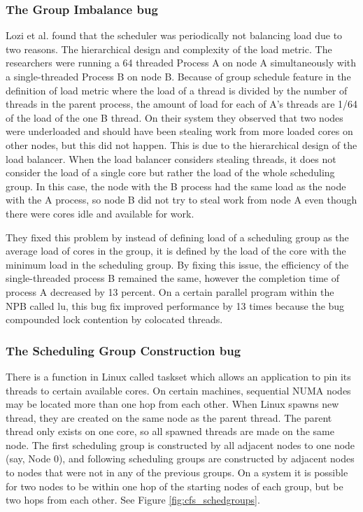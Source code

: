 \documentclass{sig-alternate}
\begin{document}
\subsubsection{The Group Imbalance bug}
\label{sec:cfsfault_grpimbalance}

Lozi et al. found that the scheduler was periodically not balancing load due to two reasons. The hierarchical design and complexity of the load metric. The researchers were running a 64 threaded  Process A on node A simultaneously with a single-threaded Process B on node B. Because of group schedule feature in the definition of load metric where the load of a thread is divided by the number of threads in the parent process, the amount of load for each of A's threads are 1/64 of the load of the one B thread. On their system they observed that two nodes were underloaded and should have been stealing work from more loaded cores on other nodes, but this did not happen. This is due to the hierarchical design of the load balancer. When the load balancer considers stealing threads, it does not consider the load of a single core but rather the load of the whole scheduling group. In this case, the node with the B process had the same load as the node with the A process, so node B did not try to steal work from node A even though there were cores idle and available for work.~\cite{Lozi:2016}

They fixed this problem by instead of defining load of a scheduling group as the average load of cores in the group, it is defined by the load of the core with the minimum load in the scheduling group. By fixing this issue, the efficiency of the single-threaded process B remained the same, however the completion time of process A decreased by 13 percent. On a certain parallel program within the NPB called lu, this bug fix improved performance by 13 times because the bug compounded lock contention by colocated threads.~\cite{Lozi:2016}

\subsubsection{The Scheduling Group Construction bug}
\label{sec:cfsfault_grpconstruct}

There is a function in Linux called taskset which allows an application to pin its threads to certain available cores. On certain machines, sequential NUMA nodes may be located more than one hop from each other. When Linux spawns new thread, they are created on the same node as the parent thread. The parent thread only exists on one core, so all spawned threads are made on the same node. The first scheduling group is constructed by all adjacent nodes to one node (say, Node 0), and following scheduling groups are constructed by adjacent nodes to nodes that were not in any of the previous groups. On a system it is possible for two nodes to be within one hop of the starting nodes of each group, but be two hops from each other. See Figure \ref{fig:cfs_schedgroups}.~\cite{Lozi:2016}
\end{document}

